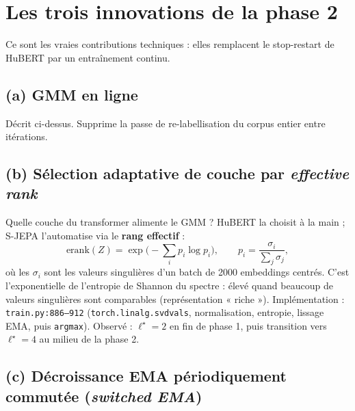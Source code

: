 \documentclass[11pt,a4paper]{article}
\newcommand{\code}[1]{\texttt{#1}}
\newcommand{\file}[1]{\texttt{#1}}
\begin{document}
\section{Les trois innovations de la phase 2}

Ce sont les vraies contributions techniques : elles remplacent le
stop-restart de HuBERT par un entraînement continu.

\subsection{(a) GMM en ligne}
Décrit ci-dessus. Supprime la passe de re-labellisation du corpus entier
entre itérations.

\subsection{(b) Sélection adaptative de couche par \emph{effective rank}}

Quelle couche du transformer alimente le GMM ? HuBERT la choisit à la
main ; S-JEPA l'automatise via le \textbf{rang effectif} :
\begin{equation}
\mathrm{erank}(Z) = \exp\!\Big(-\sum_i p_i\log p_i\Big),
\qquad p_i = \frac{\sigma_i}{\sum_j \sigma_j},
\end{equation}
où les $\sigma_i$ sont les valeurs singulières d'un batch de 2000
embeddings centrés. C'est l'exponentielle de l'entropie de Shannon du
spectre : élevé quand beaucoup de valeurs singulières sont comparables
(représentation « riche »). Implémentation : \file{train.py:886--912}
(\code{torch.linalg.svdvals}, normalisation, entropie, lissage EMA, puis
\code{argmax}). Observé : $\ell^\star=2$ en fin de phase 1, puis transition
vers $\ell^\star=4$ au milieu de la phase 2.

\subsection{(c) Décroissance EMA périodiquement commutée (\emph{switched EMA})}
\end{document}
